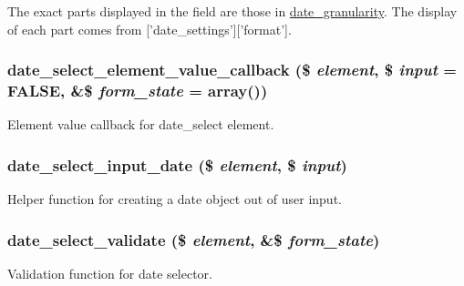 The exact parts displayed in the field are those in \hyperlink{date_8module_a524c8837d65b4e1b512a7ea3ae33d016}{date\_\-granularity}. The display of each part comes from \mbox{[}'date\_\-settings'\mbox{]}\mbox{[}'format'\mbox{]}. \hypertarget{date__api__elements_8inc_a80a2f5d6b7eda94636af25ce4125142f}{
\subsubsection[{date\_\-select\_\-element\_\-value\_\-callback}]{\setlength{\rightskip}{0pt plus 5cm}date\_\-select\_\-element\_\-value\_\-callback (\$ {\em element}, \/  \$ {\em input} = {\ttfamily FALSE}, \/  \&\$ {\em form\_\-state} = {\ttfamily array()})}}
\label{date__api__elements_8inc_a80a2f5d6b7eda94636af25ce4125142f}
Element value callback for date\_\-select element. \hypertarget{date__api__elements_8inc_a80414f7f53d30346edcbe82f8ad5b69c}{
\subsubsection[{date\_\-select\_\-input\_\-date}]{\setlength{\rightskip}{0pt plus 5cm}date\_\-select\_\-input\_\-date (\$ {\em element}, \/  \$ {\em input})}}
\label{date__api__elements_8inc_a80414f7f53d30346edcbe82f8ad5b69c}
Helper function for creating a date object out of user input. \hypertarget{date__api__elements_8inc_ab2b275d606ded86988e421c9e17d4f6d}{
\subsubsection[{date\_\-select\_\-validate}]{\setlength{\rightskip}{0pt plus 5cm}date\_\-select\_\-validate (\$ {\em element}, \/  \&\$ {\em form\_\-state})}}
\label{date__api__elements_8inc_ab2b275d606ded86988e421c9e17d4f6d}
Validation function for date selector.

